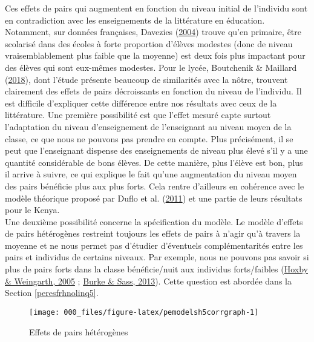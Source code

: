 \documentclass[
]{book}
\begin{document}
\quad Ces effets de pairs qui augmentent en fonction du niveau initial de l'individu sont en contradiction avec les enseignements de la littérature en éducation. Notamment, sur données françaises, Davezies (\protect\hyperlink{ref-DAV:04}{2004}) trouve qu'en primaire, être scolarisé dans des écoles à forte proportion d'élèves modestes (donc de niveau vraisemblablement plus faible que la moyenne) est deux fois plus impactant pour des élèves qui sont eux-mêmes modestes. Pour le lycée, Boutchenik \& Maillard (\protect\hyperlink{ref-BOU:MAI:18}{2018}), dont l'étude présente beaucoup de similarités avec la nôtre, trouvent clairement des effets de pairs décroissants en fonction du niveau de l'individu.
Il est difficile d'expliquer cette différence entre nos résultats avec ceux de la littérature. Une première possibilité est que l'effet mesuré capte surtout l'adaptation du niveau d'enseignement de l'enseignant au niveau moyen de la classe, ce que nous ne pouvons pas prendre en compte. Plus précisément, il se peut que l'enseignant dispense des enseignements de niveau plus élevé s'il y a une quantité considérable de bons élèves. De cette manière, plus l'élève est bon, plus il arrive à suivre, ce qui explique le fait qu'une augmentation du niveau moyen des pairs bénéficie plus aux plus forts. Cela rentre d'ailleurs en cohérence avec le modèle théorique proposé par Duflo et al. (\protect\hyperlink{ref-DUF:eal:11}{2011}) et une partie de leurs résultats pour le Kenya. \\
Une deuxième possibilité concerne la spécification du modèle. Le modèle d'effets de pairs hétérogènes restreint toujours les effets de pairs à n'agir qu'à travers la moyenne et ne nous permet pas d'étudier d'éventuels complémentarités entre les pairs et individus de certains niveaux. Par exemple, nous ne pouvons pas savoir si plus de pairs forts dans la classe bénéficie/nuit aux individus forts/faibles (\protect\hyperlink{ref-HOX:WEI:05}{Hoxby \& Weingarth, 2005} ; \protect\hyperlink{ref-BUR:SAS:13}{Burke \& Sass, 2013}). Cette question est abordée dans la Section \ref{peresfrhnolinq5}.

\begin{figure}[H]

{\centering \texttt{[image: 000\_files/figure-latex/pemodelsh5corrgraph-1]} 

}

\caption{Effets de pairs hétérogènes}\label{fig:pemodelsh5corrgraph}
\end{figure}
\end{document}
